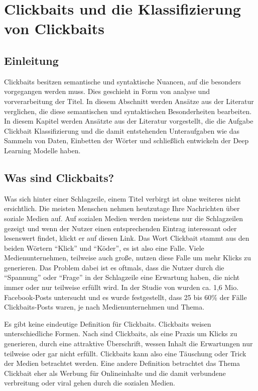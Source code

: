 
\chapter{Clickbaits und die Klassifizierung von Clickbaits}%


\section{Einleitung}
Clickbaits besitzen semantische und syntaktische Nuancen, auf die besonders vorgegangen werden muss. Dies geschieht in Form von analyse und vorverarbeitung der Titel. In diesem Abschnitt werden Ansätze aus der Literatur verglichen, die diese semantischen und syntaktischen Besonderheiten bearbeiten. In diesem Kapitel werden Ansätzte aus der Literatur vorgestellt, die die Aufgabe Clickbait Klassifizierung und die damit entstehenden Unteraufgaben wie das Sammeln von Daten, Einbetten der Wörter und schließlich entwickeln der Deep Learning Modelle haben.



\section{Was sind Clickbaits?}
Was sich hinter einer Schlagzeile, einem Titel verbirgt ist ohne weiteres nicht ersichtlich. Die meisten Menschen nehmen heutzutage Ihre Nachrichten über soziale Medien auf. Auf sozialen Medien werden meistens nur die Schlagzeilen gezeigt und wenn der Nutzer einen entsprechenden Eintrag interessant oder lesenswert findet, klickt er auf diesen Link. Das Wort Clickbait stammt aus den beiden Wörtern \enquote{Klick} und \enquote{Köder}, es ist also eine Falle. Viele Medienunternehmen, teilweise auch große, nutzen diese Falle um mehr Klicks zu generieren. Das Problem dabei ist es oftmals, dass die Nutzer durch die \enquote{Spannung} oder \enquote{Frage} in der Schlagzeile eine Erwartung haben, die nicht immer oder nur teilweise erfüllt wird. In der Studie von \cite*{Main} wurden ca. 1,6 Mio. Facebook-Posts untersucht und es wurde festgestellt, dass 25 bis 60\% der Fälle Clickbaits-Posts waren, je nach Medienunternehmen und Thema.

Es gibt keine eindeutige Definition für Clickbaits. Clickbaits weisen unterschiedliche Formen. Nach \cite*{Biyani2016} sind Clickbaits, als eine Praxis um Klicks zu generieren, durch eine attraktive Überschrift, wessen Inhalt die Erwartungen nur teilweise oder gar nicht erfüllt. Clickbaits kann also eine Täuschung oder Trick der Medien betrachtet werden. Eine andere Definition \cite*{Potthasta} betrachtet das Thema Clickbait eher als Werbung für Onlineinhalte und die damit verbundene verbreitung oder viral gehen durch die sozialen Medien.

